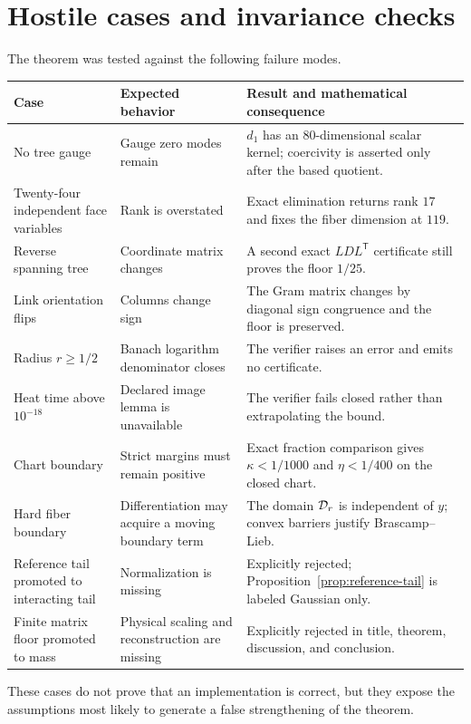 \section{Hostile cases and invariance checks}\label{app:stress}

The theorem was tested against the following failure modes.

\begin{longtable}{@{}p{}p{}p{}@{}}
\toprule
Case & Expected behavior & Result and mathematical consequence\\
\midrule
\endhead
No tree gauge & Gauge zero modes remain & $d_1$ has an $80$-dimensional scalar kernel; coercivity is asserted only after the based quotient.\\
Twenty-four independent face variables & Rank is overstated & Exact elimination returns rank $17$ and fixes the fiber dimension at $119$.\\
Reverse spanning tree & Coordinate matrix changes & A second exact $LDL^{\mathsf T}$ certificate still proves the floor $1/25$.\\
Link orientation flips & Columns change sign & The Gram matrix changes by diagonal sign congruence and the floor is preserved.\\
Radius $r\ge1/2$ & Banach logarithm denominator closes & The verifier raises an error and emits no certificate.\\
Heat time above $10^{-18}$ & Declared image lemma is unavailable & The verifier fails closed rather than extrapolating the bound.\\
Chart boundary & Strict margins must remain positive & Exact fraction comparison gives $\kappa<1/1000$ and $\eta<1/400$ on the closed chart.\\
Hard fiber boundary & Differentiation may acquire a moving boundary term & The domain $\mathcal D_r$ is independent of $y$; convex barriers justify Brascamp--Lieb.\\
Reference tail promoted to interacting tail & Normalization is missing & Explicitly rejected; Proposition~\ref{prop:reference-tail} is labeled Gaussian only.\\
Finite matrix floor promoted to mass & Physical scaling and reconstruction are missing & Explicitly rejected in title, theorem, discussion, and conclusion.\\
\bottomrule
\end{longtable}

These cases do not prove that an implementation is correct, but they expose
the assumptions most likely to generate a false strengthening of the theorem.
